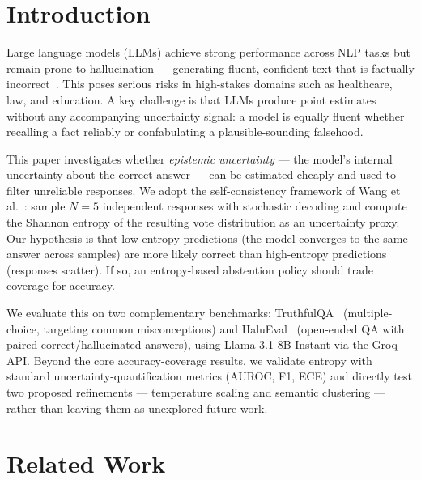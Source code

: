 \documentclass{llncs}
\begin{document}
\section{Introduction}

Large language models (LLMs) achieve strong performance across NLP tasks but
remain prone to hallucination — generating fluent, confident text that is
factually incorrect~\cite{ji2023survey}. This poses serious risks in
high-stakes domains such as healthcare, law, and education. A key challenge is
that LLMs produce point estimates without any accompanying uncertainty
signal: a model is equally fluent whether recalling a fact reliably or
confabulating a plausible-sounding falsehood.

This paper investigates whether \emph{epistemic uncertainty} — the model's
internal uncertainty about the correct answer — can be estimated cheaply and
used to filter unreliable responses. We adopt the self-consistency framework
of Wang et al.~\cite{wang2023selfconsistency}: sample $N{=}5$ independent
responses with stochastic decoding and compute the Shannon entropy of the
resulting vote distribution as an uncertainty proxy. Our hypothesis is that
low-entropy predictions (the model converges to the same answer across
samples) are more likely correct than high-entropy predictions (responses
scatter). If so, an entropy-based abstention policy should trade coverage for
accuracy.

We evaluate this on two complementary benchmarks: TruthfulQA~\cite{lin2022truthfulqa}
(multiple-choice, targeting common misconceptions) and
HaluEval~\cite{ji2023halueval} (open-ended QA with paired correct/hallucinated
answers), using Llama-3.1-8B-Instant via the Groq API. Beyond the core
accuracy-coverage results, we validate entropy with standard
uncertainty-quantification metrics (AUROC, F1, ECE) and directly test two
proposed refinements — temperature scaling and semantic clustering — rather
than leaving them as unexplored future work.

\FloatBarrier

\section{Related Work}
\label{sec:related}
\end{document}
